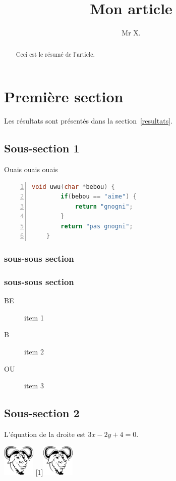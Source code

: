 \documentclass{article}
\title{Mon article}
\author{Mr X.}
\begin{document}
\maketitle

\begin{abstract}
    Ceci est le résumé de l'article.
\end{abstract}

\tableofcontents

\section{Première section}

Les résultats sont présentés dans la section~\ref{resultats}.

\subsection{Sous-section 1}

Ouais ouais ouais \cite{preparata-1988}

\begin{lstlisting}[language=C, numbers=left, frame=single]
    void uwu(char *bebou) {
        if(bebou == "aime") {
            return "gnogni";
        }
        return "pas gnogni";
    }
\end{lstlisting}

\subsubsection{sous-sous section}

\subsubsection{sous-sous section}

\begin{description}
    \item[BE] item 1
    \item[B] item 2
    \item[OU] item 3
\end{description}


\subsection{Sous-section 2}

L’équation de la droite est $3x - 2y + 4 = 0$.

\includegraphics[height=1.5cm]{gnu.png}
\scalebox{-1}[1]{\includegraphics[height=1.5cm]{gnu.png}}
\end{document}
